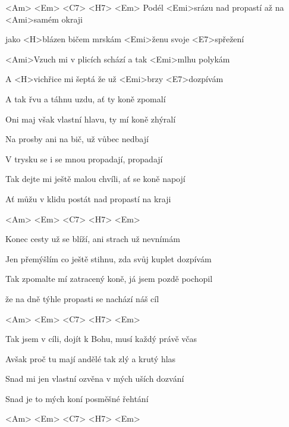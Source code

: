 

<Am> <Em> <C7> <H7> <Em>
\zs
Podél <Emi>srázu nad propastí až na <Ami>samém okraji

jako <H>blázen bičem mrskám <Emi>ženu svoje <E7>spřežení
\ks

\zs
<Ami>Vzuch mi v plicích schází a tak <Emi>mlhu polykám

A <H>vichřice mi šeptá že už <Emi>brzy <E7>dozpívám
\ks

\zr
A tak řvu a táhnu uzdu, ať ty koně zpomalí

Oni maj však vlastní hlavu, ty mí koně zhýralí

Na prosby ani na bič, už vůbec nedbají

V trysku se i se mnou propadají, propadají

Tak dejte mi ještě malou chvíli, ať se koně napojí

Ať můžu v klidu postát nad propastí na kraji
\kr

<Am> <Em> <C7> <H7> <Em>

\zs
Konec cesty už se blíží, ani strach už nevnímám

Jen přemýšlím co ještě stihnu, zda svůj kuplet dozpívám

Tak zpomalte mí zatracený koně, já jsem pozdě pochopil

že na dně týhle propasti se nachází náš cíl
\ks

\zr
\kr

<Am> <Em> <C7> <H7> <Em>

\zs
Tak jsem v cíli, dojít k Bohu, musí každý právě včas

Avšak proč tu mají andělé tak zlý a krutý hlas

Snad mi jen vlastní ozvěna v mých uších dozvání

Snad je to mých koní posměšné řehtání
\ks

\zr
\kr

<Am> <Em> <C7> <H7> <Em>

\kp
